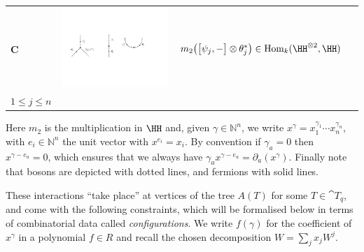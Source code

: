 \documentclass[english,letter paper,12pt,leqno]{article}
\theoremstyle{example}
\numberwithin{equation}{section}
\def\Hom{\operatorname{Hom}}
\begin{document}
\begin{center}
\begin{tabular}{ >{\centering}m{1cm} >{\centering}m{4cm} >{\centering}m{8cm} >{\centering}m{1cm}}
\textbf{C}
&
\includegraphics[scale=0.4]{dia4}
&
$m_2 \big( \big[\psi_j,-\big] \otimes \theta_j^* \big) \in \Hom_k( \HH^{\otimes 2}, \HH )$\\
\vspace{0.5cm}
$1 \le j \le n$
&
\tagarray{\label{interaction_3}}
\end{tabular}
\end{center}
Here $m_2$ is the multiplication in $\HH$ and, given $\gamma \in \mathbb{N}^n$, we write $x^\gamma = x_1^{\gamma_1} \cdots x_n^{\gamma_n}$, with $e_i \in \mathbb{N}^n$ the unit vector with $x^{e_i} = x_i$. By convention if $\gamma_a = 0$ then $x^{\gamma - e_a} = 0$, which ensures that we always have $\gamma_a x^{\gamma - e_a} = \partial_a(x^\gamma)$. Finally note that bosons are depicted with dotted lines, and fermions with solid lines.

These interactions ``take place'' at vertices of the tree $A(T)$ for some $T \in \cat{T}_q$, and come with the following constraints, which will be formalised below in terms of combinatorial data called \emph{configurations}. We write $f(\gamma)$ for the coefficient of $x^\gamma$ in a polynomial $f \in R$ and recall the chosen decomposition $W = \sum_j x_j W^j$. 
\end{document}
